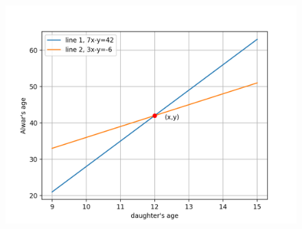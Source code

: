 \documentclass[journal]{IEEEtran}
\begin{document}
\begin{figure}[H]
    \centering
    \includegraphics[width=\columnwidth]{figs/figure.png}
    \caption{}
    \label{fig:placeholder}
\end{figure}
\end{document}

